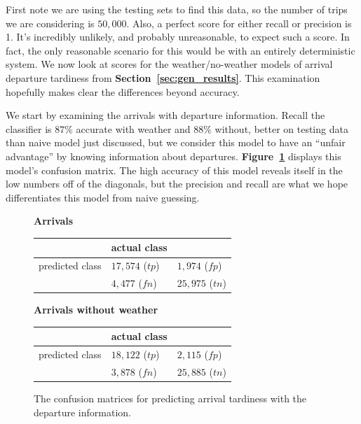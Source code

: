 \documentclass[11pt]{article} %
\begin{document}
First note we are using the testing sets to find this data, so the number of 
trips we are considering is $50,000$. Also, a perfect score for either recall or
precision is 1. It's incredibly unlikely, and probably unreasonable, to expect 
such a score. In fact, the only reasonable scenario for this would be with an
entirely deterministic system.  We now look at scores for the weather/no-weather 
models of arrival
departure tardiness from \textbf{Section~\ref{sec:gen_results}}. This examination
hopefully makes clear the differences beyond accuracy.

We start by examining the arrivals with departure information. Recall the 
classifier is $87\%$ accurate with weather and $88\%$ without, better on testing
data than
naive model just discussed, but we consider this model to have an 
``unfair advantage'' by knowing information about departures. 
\textbf{Figure~\ref{fig:confusion_arrivals}} displays this model's confusion
matrix.
The high accuracy of this model reveals itself in the low numbers off of the 
diagonals, but the precision and recall are what we hope differentiates
this model from naive guessing. 

\begin{figure}
    \textbf{Arrivals}

    \begin{tabular}[h]{l|ll}
                         & actual class &  \\
         \hline
         predicted class & $17,574 $ ($tp$)& $1,974$ ($fp$)\\
                         & $4,477$ ($fn$)& $25,975$ ($tn$)\\
    \end{tabular}

    \textbf{Arrivals without weather}

    \begin{tabular}[h]{l|ll}
                         & actual class &  \\
         \hline
         predicted class & $18,122$ ($tp$)& $2,115$ ($fp$)\\
                         & $3,878$ ($fn$)& $25,885$ ($tn$)\\
    \end{tabular}
    \caption{The confusion matrices for predicting arrival tardiness with
    the departure information.}
    \label{fig:confusion_arrivals}
\end{figure}
\end{document}
